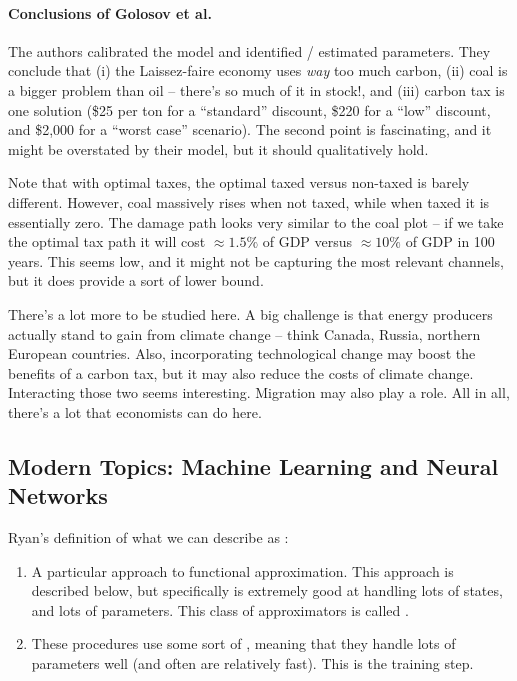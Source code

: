 \documentclass[10pt]{article}
\begin{document}
\paragraph{Conclusions of Golosov et al.} The authors calibrated the model and identified / estimated parameters. They conclude that (i) the Laissez-faire economy uses \emph{way} too much carbon, (ii) coal is a bigger problem than oil -- there's so much of it in stock!, and (iii) carbon tax is one solution (\$25 per ton for a ``standard'' discount, \$220 for a ``low'' discount, and \$2,000 for a ``worst case'' scenario). The second point is fascinating, and it might be overstated by their model, but it should qualitatively hold. 

Note that with optimal taxes, the optimal taxed versus non-taxed is barely different. However, coal massively rises when not taxed, while when taxed it is essentially zero. The damage path looks very similar to the coal plot -- if we take the optimal tax path it will cost $\approx 1.5\%$ of GDP versus $\approx 10\%$ of GDP in 100 years. This seems low, and it might not be capturing the most relevant channels, but it does provide a sort of lower bound.

There's a lot more to be studied here. A big challenge is that energy producers actually stand to gain from climate change -- think Canada, Russia, northern European countries. Also, incorporating technological change may boost the benefits of a carbon tax, but it may also reduce the costs of climate change. Interacting those two seems interesting. Migration may also play a role. All in all, there's a lot that economists can do here.



\subsection{Modern Topics: Machine Learning and Neural Networks}

\begin{definition}
	Ryan's definition of what we can describe as :
	\begin{enumerate}
		\item A particular approach to functional approximation. This approach is described below, but specifically is extremely good at handling lots of states, and lots of parameters. This class of approximators is called .
		\item These procedures use some sort of , meaning that they handle lots of parameters well (and often are relatively fast). This is the training step.
	\end{enumerate}
\end{definition}
\end{document}
